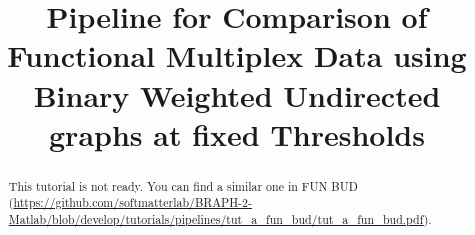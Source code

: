 \documentclass[justified]{tufte-handout}
\title{Pipeline for Comparison of Functional Multiplex Data using Binary Weighted Undirected graphs at fixed Thresholds}
\begin{document}
\maketitle

\begin{abstract}
\noindent
This tutorial is not ready. You can find a similar one in FUN BUD (\url{https://github.com/softmatterlab/BRAPH-2-Matlab/blob/develop/tutorials/pipelines/tut_a_fun_bud/tut_a_fun_bud.pdf}).
\end{abstract}
\end{document}
